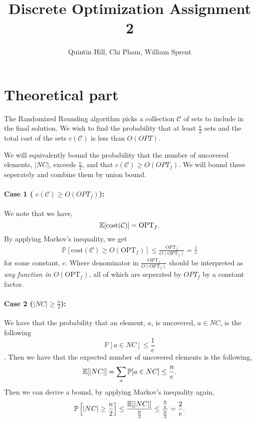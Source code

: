 \documentclass[11pt,a4paper,english]{article}
\newcommand{\PP}{\mathbb{P}}      %
\newcommand{\EE}{\mathbb{E}}      %
\begin{document}
\title{Discrete Optimization Assignment 2}
\author{Quintin Hill, Chi Pham, William Sprent}
\maketitle
\tableofcontents
\clearpage

\section{Theoretical part}
The Randomized Rounding algorithm picks a collection $\mathcal{C}$ of sets to include in
the final solution. We wish to find the probability that at least $\frac{n}{2}$ sets and
the total cost of the sets $c(\mathcal{C})$ is less than $O(OPT)$.

We will equivalently bound the probability that the number of uncovered elements, $|NC|$,
exceeds $\frac{n}{2}$, and that $c(\mathcal{C}) \geq O(OPT_f)$. We will bound these seperately
and combine them by union bound.

\paragraph{Case 1 ( $c(\mathcal{C}) \geq O(OPT_f)$):}
We note that we have,
$$\EE[\mathrm{cost}(\mathcal{C})] = \mathrm{OPT}_f\mathnormal{.}$$
By applying Markov's inequality, we get
\begin{align*}
\PP[\mathrm{cost}(\mathcal{C}) \geq O(\mathrm{OPT}_f)]
  \leq \frac{\mathrm{OPT}_f}{O(\mathrm{OPT}_f)}
  = \frac{1}{c}
\end{align*}
for some constant, $c$. Where denominator in $\frac{\mathrm{OPT}_f}{O(\mathrm{OPT}_f)}$ should be interpreted as
 \textit{any function in $O(\mathrm{OPT}_f)$}, all of which are seperated by $OPT_f$ by a constant factor.

\paragraph{Case 2 ($|NC| \geq \frac{n}{2}$):}
We have that the probability that an element, $a$, is uncovered, $a \in NC$, is the following
$$\PP[a \in NC] \leq \frac{1}{e}$$
\citep[p. 121]{Vaz}.
Then we have that the expected number of uncovered elements is the following,
$$\EE[|NC|] = \sum_a \PP[a \in NC] \leq \frac{n}{e}\mathnormal{.}$$
Then we can derive a bound, by applying Markov's inequality again,
\begin{align*}
  \PP\left[|NC| \geq \frac{n}{2}\right] \leq \frac{\EE[|NC|]}{\frac{n}{2}}
                             \leq \frac{\frac{n}{e}}{\frac{n}{2}} 
                             = \frac{2}{e}\mathnormal{.}
\end{align*}
\end{document}
